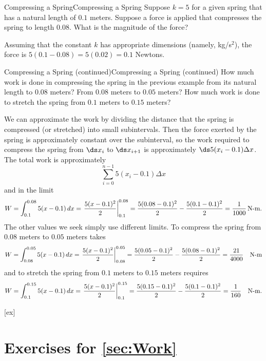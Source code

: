 \begin{example}{Compressing a Spring}{Compressing a Spring}\label{Compressing a Spring} 
Suppose $k=5$ for a given spring that has a natural length of
$0.1$ meters. Suppose a force is applied that compresses the spring to
length $0.08$. What is the magnitude of the force?
\end{example}

\begin{solution}
Assuming that the
constant $k$ has appropriate dimensions (namely, kg/s$^2$), the force is
$5(0.1-0.08)=5(0.02)=0.1$ Newtons.
\end{solution}

\begin{example}{Compressing a Spring (continued)}{Compressing a Spring (continued)}\label{Compressing a Spring (continued)} 
How much work is done in compressing the spring in the
previous example from its natural length to $0.08$ meters? 
From $0.08$ meters to $0.05$ meters? 
How much work is done to stretch the spring
from $0.1$ meters to $0.15$ meters?
\end{example}

\begin{solution}
We can approximate the work by
dividing the distance that the spring is compressed (or stretched)
into small subintervals. Then the force exerted by the spring is
approximately constant over the subinterval, so the work required to
compress the spring from $\ds x_i$ to $\ds x_{i+1}$ is approximately
$\ds 5(x_i-0.1)\Delta x$.  The total work is approximately
$$\sum_{i=0}^{n-1} 5(x_i-0.1)\Delta x$$
and in the limit
$$W=\int_{0.1}^{0.08} 5(x-0.1)\,dx=\left.{5(x-0.1)^2\over2}\right|_{0.1}^{0.08}=
{5(0.08-0.1)^2\over2}-{5(0.1-0.1)^2\over2}={1\over1000}\,\hbox{N-m}.$$
The other values we seek simply use different limits. To compress the
spring from $0.08$
meters to $0.05$ meters takes
$$W=\int_{0.08}^{0.05} 5(x-0.1)\,dx=\left.{5(x-0.1)^2\over2}\right|_{0.08}^{0.05}=
{5(0.05-0.1)^2\over2}-{5(0.08-0.1)^2\over2}={21\over4000}\quad\hbox{N-m}$$
and to stretch the spring
from $0.1$ meters to $0.15$ meters requires
$$W=\int_{0.1}^{0.15} 5(x-0.1)\,dx=\left.{5(x-0.1)^2\over2}\right|_{0.1}^{0.15}=
{5(0.15-0.1)^2\over2}-{5(0.1-0.1)^2\over2}={1\over160}\quad\hbox{N-m}.$$
\end{solution}


[ex]
\section*{Exercises for \ref{sec:Work}}

